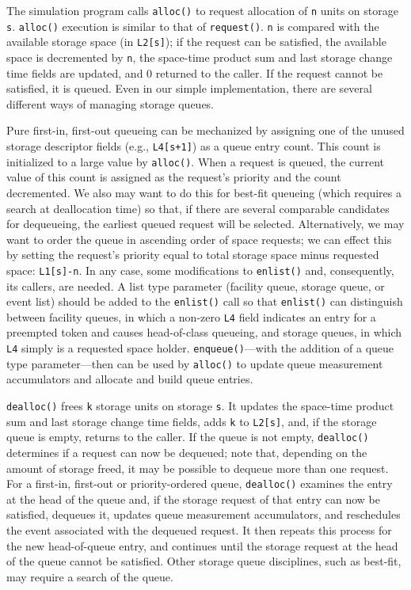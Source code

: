 The simulation program calls \texttt{alloc()} to request allocation of \texttt{n} units on
storage \texttt{s}. \texttt{alloc()} execution is similar to that of \texttt{request()}. \texttt{n} is compared
with the available storage space (in \texttt{L2[s]}); if the request can be
satisfied, the available space is decremented by \texttt{n}, the space-time product
sum and last storage change time fields are updated, and 0 returned to the
caller. If the request cannot be satisfied, it is queued. Even in our simple
implementation, there are several different ways of managing storage
queues.

Pure first-in, first-out queueing can be mechanized by assigning one of the
unused storage descriptor fields (e.g., \texttt{L4[s+1]}) as a queue entry count. This
count is initialized to a large value by \texttt{alloc()}. When a request is queued,
the current value of this count is assigned as the request's priority and the
count decremented. We also may want to do this for best-fit queueing (which
requires a search at deallocation time) so that, if there are several comparable
candidates for dequeueing, the earliest queued request will be selected.
Alternatively, we may want to order the queue in ascending order of space
requests; we can effect this by setting the request's priority equal to total
storage space minus requested space: \texttt{L1[s]-n}. In any case, some modifications
to \texttt{enlist()} and, consequently, its callers, are needed. A list type
parameter (facility queue, storage queue, or event list) should be added to
the \texttt{enlist()} call so that \texttt{enlist()} can distinguish between facility
queues, in which a non-zero \texttt{L4} field indicates an entry for a preempted token
and causes head-of-class queueing, and storage queues, in which \texttt{L4} simply is
a requested space holder. \texttt{enqueue()}---with the addition of a queue type
parameter---then can be used by \texttt{alloc()} to update queue measurement
accumulators and allocate and build queue entries.

\texttt{dealloc()} frees \texttt{k} storage units on storage \texttt{s}. It updates the space-time
product sum and last storage change time fields, adds \texttt{k} to \texttt{L2[s]}, and, if the
storage queue is empty, returns to the caller. If the queue is not empty,
\texttt{dealloc()} determines if a request can now be dequeued; note that, depending
on the amount of storage freed, it may be possible to dequeue more than
one request. For a first-in, first-out or priority-ordered queue, \texttt{dealloc()}
examines the entry at the head of the queue and, if the storage request of
that entry can now be satisfied, dequeues it, updates queue measurement
accumulators, and reschedules the event associated with the dequeued
request. It then repeats this process for the new head-of-queue entry, and
continues until the storage request at the head of the queue cannot be
satisfied. Other storage queue disciplines, such as best-fit, may require a
search of the queue.

